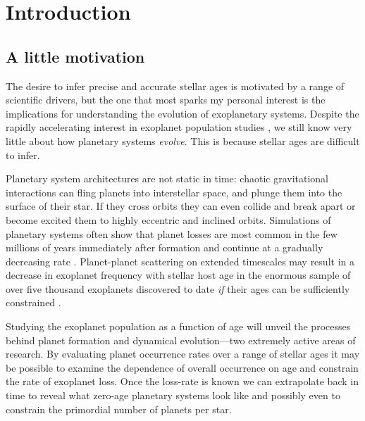 \chapter{Introduction}
\section{A little motivation}

The desire to infer precise and accurate stellar ages is motivated by a range
of scientific drivers, but the one that most sparks my personal interest is
the implications for understanding the evolution of exoplanetary systems.
Despite the rapidly accelerating interest in exoplanet population studies
\citep[e.g.][]{petigura, dressing, foreman-mackey, burke}, we still know very
little about how planetary systems {\it evolve}.
This is because stellar ages are difficult to infer.

Planetary system architectures are not static in time: chaotic gravitational
interactions can fling planets into interstellar space, and plunge them into
the surface of their star.
If they cross orbits they can even collide and break apart or become excited
them to highly eccentric and inclined orbits.
Simulations of planetary systems often show that planet losses are most common
in the few millions of years immediately after formation and continue at a
gradually decreasing rate \citep[e.g.][]{zhou, smith, funk, Pu2015}.
Planet-planet scattering on extended timescales may result in a decrease in
exoplanet frequency with stellar host age in the enormous sample of over five
thousand exoplanets discovered to date {\it if} their ages can be sufficiently
constrained \citep{veras}.

Studying the exoplanet population as a function of age will unveil the
processes behind planet formation and dynamical evolution---two extremely
active areas of research.
By evaluating planet occurrence rates over a range of stellar ages it may be
possible to examine the dependence of overall occurrence on age and constrain
the rate of exoplanet loss.
Once the loss-rate is known we can extrapolate back in time to reveal what
zero-age planetary systems look like and possibly even to constrain the
primordial number of planets per star.

